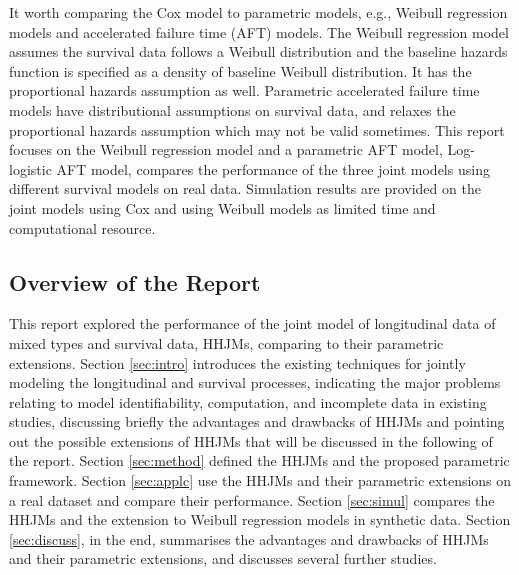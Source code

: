 It worth comparing the Cox model to parametric models, e.g., Weibull regression models and accelerated failure time (AFT) models. The Weibull regression model assumes the survival data follows a Weibull distribution and the baseline hazards  function is specified as a density of baseline Weibull distribution. It has the proportional hazards assumption as well. Parametric accelerated failure time models have distributional assumptions on survival data, and relaxes the proportional hazards assumption which may not be valid sometimes. This report focuses on the Weibull regression model and a parametric AFT model, Log-logistic AFT model, compares the performance of the three joint models using different survival models on real data. Simulation results are provided on the joint models using Cox and using Weibull models as limited time and computational resource.


\subsection{Overview of the Report}

This report explored the performance of the joint model of longitudinal data of mixed types and survival data, HHJMs, comparing to their parametric extensions. Section \ref{sec:intro} introduces the existing techniques for jointly modeling the longitudinal and survival processes, indicating the major problems relating to model identifiability, computation, and incomplete data in existing studies, discussing briefly the advantages and drawbacks of HHJMs and pointing out the possible extensions of HHJMs that will be discussed in the following of the report. Section \ref{sec:method} defined the HHJMs and the proposed parametric framework. Section \ref{sec:applc} use the HHJMs and their parametric extensions on a real dataset and compare their performance. Section \ref{sec:simul} compares the HHJMs and the extension to Weibull regression models in synthetic data. Section \ref{sec:discuss}, in the end, summarises the advantages and drawbacks of HHJMs and their parametric extensions, and discusses several further studies.






